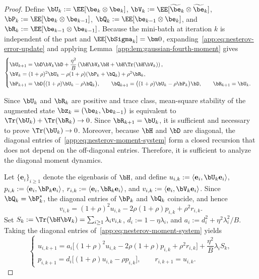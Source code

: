 \begin{proof}
Define \(\bU_k:=\EE[\be_k\otimes\be_k]\), \(\bV_k:=\EE[\widetilde{\be}_k\otimes\widetilde{\be}_k]\), \(\bP_k:=\EE[\be_k\otimes\be_{k-1}]\), \(\bQ_k:=\EE[\be_{k-1}\otimes\be_k]\), and \(\bR_k:=\EE[\be_{k-1}\otimes\be_{k-1}]\). Because the mini-batch at iteration \(k\) is independent of the past and \(\EE[\bSigma_k]=\bm0\), expanding~\eqref{app:eq:nesterov-error-update} and applying Lemma~\ref{app:lem:gaussian-fourth-moment} gives
\begin{equation}
\label{app:eq:nesterov-moment-system}
\begin{cases}
\bU_{k+1}=\bD\bV_k\bD+\dfrac{\eta^2}{B}\left(\bH\bV_k\bH+\bH\Tr(\bH\bV_k)\right),\\[1mm]
\bV_k=(1+\rho)^2\bU_k-\rho(1+\rho)(\bP_k+\bQ_k)+\rho^2\bR_k,\\[1mm]
\bP_{k+1}=\bD\big((1+\rho)\bU_k-\rho\bQ_k\big),\qquad
\bQ_{k+1}=\big((1+\rho)\bU_k-\rho\bP_k\big)\bD,\qquad
\bR_{k+1}=\bU_k.
\end{cases}
\end{equation}

Since \(\bU_k\) and \(\bR_k\) are positive and trace class, mean-square stability of the augmented state \(\bz_k=(\be_k,\be_{k-1})\) is equivalent to \(\Tr(\bU_k)+\Tr(\bR_k)\to0\). Since \(\bR_{k+1}=\bU_k\), it is sufficient and necessary to prove \(\Tr(\bU_k)\to0\). Moreover, because \(\bH\) and \(\bD\) are diagonal, the diagonal entries of~\eqref{app:eq:nesterov-moment-system} form a closed recursion that does not depend on the off-diagonal entries. Therefore, it is sufficient to analyze the diagonal moment dynamics.

Let \(\{\mathbf e_i\}_{i\geq1}\) denote the eigenbasis of \(\bH\), and define \(u_{i,k}:=\langle\mathbf e_i,\bU_k\mathbf e_i\rangle\), \(p_{i,k}:=\langle\mathbf e_i,\bP_k\mathbf e_i\rangle\), \(r_{i,k}:=\langle\mathbf e_i,\bR_k\mathbf e_i\rangle\), and \(v_{i,k}:=\langle\mathbf e_i,\bV_k\mathbf e_i\rangle\). Since \(\bQ_k=\bP_k^*\), the diagonal entries of \(\bP_k\) and \(\bQ_k\) coincide, and hence
\[
v_{i,k}=(1+\rho)^2u_{i,k}-2\rho(1+\rho)p_{i,k}+\rho^2r_{i,k}.
\]
Set \(S_k:=\Tr(\bH\bV_k)=\sum_{i\geq1}\lambda_i v_{i,k}\), \(d_i:=1-\eta\lambda_i\), and \(a_i:=d_i^2+\eta^2\lambda_i^2/B\). Taking the diagonal entries of~\eqref{app:eq:nesterov-moment-system} yields
\begin{equation}
\label{app:eq:nesterov-diagonal-recursion}
\begin{cases}
u_{i,k+1}=a_i\big[(1+\rho)^2u_{i,k}-2\rho(1+\rho)p_{i,k}+\rho^2r_{i,k}\big]+\dfrac{\eta^2}{B}\lambda_iS_k,\\[1mm]
p_{i,k+1}=d_i\big[(1+\rho)u_{i,k}-\rho p_{i,k}\big],\qquad
r_{i,k+1}=u_{i,k}.
\end{cases}
\end{equation}


\end{proof}
